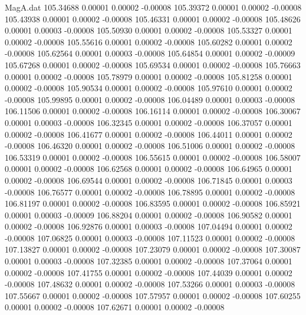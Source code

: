 \begin{filecontents}{MagA.dat}
 105.34688    0.00001    0.00002   -0.00008
 105.39372    0.00001    0.00002   -0.00008
 105.43938    0.00001    0.00002   -0.00008
 105.46331    0.00001    0.00002   -0.00008
 105.48626    0.00001    0.00003   -0.00008
 105.50930    0.00001    0.00002   -0.00008
 105.53327    0.00001    0.00002   -0.00008
 105.55616    0.00001    0.00002   -0.00008
 105.60282    0.00001    0.00002   -0.00008
 105.62564    0.00001    0.00003   -0.00008
 105.64854    0.00001    0.00002   -0.00009
 105.67268    0.00001    0.00002   -0.00008
 105.69534    0.00001    0.00002   -0.00008
 105.76663    0.00001    0.00002   -0.00008
 105.78979    0.00001    0.00002   -0.00008
 105.81258    0.00001    0.00002   -0.00008
 105.90534    0.00001    0.00002   -0.00008
 105.97610    0.00001    0.00002   -0.00008
 105.99895    0.00001    0.00002   -0.00008
 106.04489    0.00001    0.00003   -0.00008
 106.11506    0.00001    0.00002   -0.00008
 106.16114    0.00001    0.00002   -0.00008
 106.30067    0.00001    0.00003   -0.00008
 106.32345    0.00001    0.00002   -0.00008
 106.37057    0.00001    0.00002   -0.00008
 106.41677    0.00001    0.00002   -0.00008
 106.44011    0.00001    0.00002   -0.00008
 106.46320    0.00001    0.00002   -0.00008
 106.51006    0.00001    0.00002   -0.00008
 106.53319    0.00001    0.00002   -0.00008
 106.55615    0.00001    0.00002   -0.00008
 106.58007    0.00001    0.00002   -0.00008
 106.62568    0.00001    0.00002   -0.00008
 106.64965    0.00001    0.00002   -0.00008
 106.69544    0.00001    0.00002   -0.00008
 106.71845    0.00001    0.00003   -0.00008
 106.76577    0.00001    0.00002   -0.00008
 106.78895    0.00001    0.00002   -0.00008
 106.81197    0.00001    0.00002   -0.00008
 106.83595    0.00001    0.00002   -0.00008
 106.85921    0.00001    0.00003   -0.00009
 106.88204    0.00001    0.00002   -0.00008
 106.90582    0.00001    0.00002   -0.00008
 106.92876    0.00001    0.00003   -0.00008
 107.04494    0.00001    0.00002   -0.00008
 107.06825    0.00001    0.00003   -0.00008
 107.11523    0.00001    0.00002   -0.00008
 107.13827    0.00001    0.00002   -0.00008
 107.23079    0.00001    0.00002   -0.00008
 107.30087    0.00001    0.00003   -0.00008
 107.32385    0.00001    0.00002   -0.00008
 107.37064    0.00001    0.00002   -0.00008
 107.41755    0.00001    0.00002   -0.00008
 107.44039    0.00001    0.00002   -0.00008
 107.48632    0.00001    0.00002   -0.00008
 107.53266    0.00001    0.00003   -0.00008
 107.55667    0.00001    0.00002   -0.00008
 107.57957    0.00001    0.00002   -0.00008
 107.60255    0.00001    0.00002   -0.00008
 107.62671    0.00001    0.00002   -0.00008

\end{filecontents}
